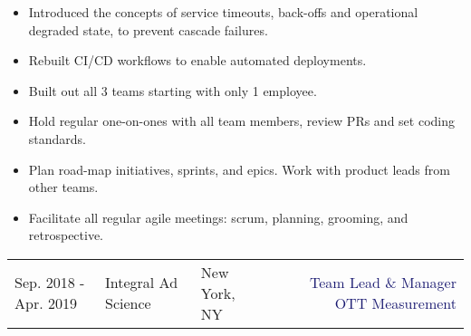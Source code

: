 \documentclass{article}
\begin{document}
\begin{multicols}{2}
\begin{small}
\begin{itemize}[leftmargin=*,label=\tiny{$\bullet$}]
    \item\begin{minipage}[t]{\linewidth}{Introduced the concepts of service timeouts, back-offs and operational degraded state, to prevent cascade failures.}\end{minipage}
    \item\begin{minipage}[t]{\linewidth}{Rebuilt CI/CD workflows to enable automated deployments.}\end{minipage}
    \item\begin{minipage}[t]{\linewidth}{Built out all 3 teams starting with only 1 employee.}\end{minipage}
    \item\begin{minipage}[t]{\linewidth}{Hold regular one-on-ones with all team members, review PRs and set coding standards.}\end{minipage}
    \item\begin{minipage}[t]{\linewidth}{Plan road-map initiatives, sprints, and epics. Work with product leads from other teams.}\end{minipage}
    \item\begin{minipage}[t]{\linewidth}{Facilitate all regular agile meetings: scrum, planning, grooming, and retrospective.}\end{minipage}
    \end{itemize}
  \end{small} 
\end{multicols}

\vspace{15pt}\begin{tabularx}{\textwidth}{@{}lllXr}
  Sep. 2018 - Apr. 2019&\textcolor{Mahogany}{Integral Ad Science}&\textcolor{Black!80}{New York, NY}&&
  \begin{minipage}[t]{1.9in}{\textcolor{MidnightBlue}{Team Lead \& Manager OTT Measurement}}\end{minipage}
\end{tabularx}
\end{document}
